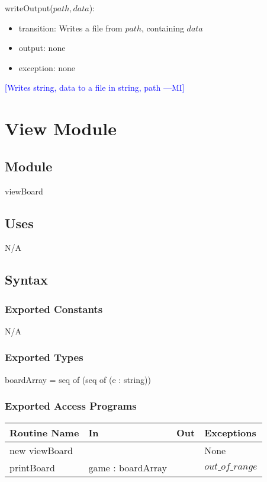 \documentclass{article}
\newcommand{\authornote}[3]{\textcolor{#1}{[#3 ---#2]}}
\newcommand{\authornote}[3]{}
\newcommand{\wss}[1]{\authornote{blue}{MI}{#1}}
\begin{document}
\noindent writeOutput($path,data$):
\begin{itemize}
\item transition: Writes a file from $path$, containing $data$
\item output: none
\item exception: none
\end{itemize}
\wss{Writes string, data to a file in string, path}

\newpage

\section*{View Module}

\subsection*{Module}
viewBoard

\subsection*{Uses}
N/A
\subsection*{Syntax}

\subsubsection* {Exported Constants}
N/A

\subsubsection* {Exported Types}
boardArray = seq of (seq of (e : string))
\subsubsection* {Exported Access Programs}

\begin{table}[!ht]
    \begin{tabular}{|l|l|l|l|}
        \hline
        Routine Name  & In & Out & Exceptions \\ \hline
        new viewBoard & ~  & ~   & None       \\ \hline
        printBoard    & game : boardArray  & ~   & $out\_of\_range$       \\
        \hline
    \end{tabular}
\end{table}
\end{document}

